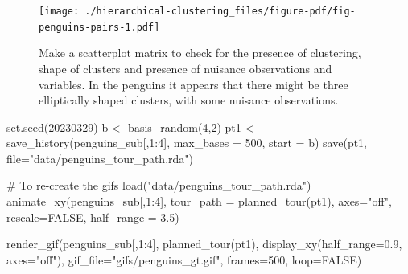 \documentclass[
  letterpaper,
]{book}
\newenvironment{Shaded}{\begin{snugshade}}{\end{snugshade}}
\newcommand{\AttributeTok}[1]{\textcolor[rgb]{0.40,0.45,0.13}{#1}}
\newcommand{\CommentTok}[1]{\textcolor[rgb]{0.37,0.37,0.37}{#1}}
\newcommand{\ConstantTok}[1]{\textcolor[rgb]{0.56,0.35,0.01}{#1}}
\newcommand{\DecValTok}[1]{\textcolor[rgb]{0.68,0.00,0.00}{#1}}
\newcommand{\FloatTok}[1]{\textcolor[rgb]{0.68,0.00,0.00}{#1}}
\newcommand{\FunctionTok}[1]{\textcolor[rgb]{0.28,0.35,0.67}{#1}}
\newcommand{\NormalTok}[1]{\textcolor[rgb]{0.00,0.23,0.31}{#1}}
\newcommand{\OtherTok}[1]{\textcolor[rgb]{0.00,0.23,0.31}{#1}}
\newcommand{\SpecialCharTok}[1]{\textcolor[rgb]{0.37,0.37,0.37}{#1}}
\newcommand{\StringTok}[1]{\textcolor[rgb]{0.13,0.47,0.30}{#1}}
\begin{document}
\begin{figure}[H]

{\centering \texttt{[image: ./hierarchical-clustering\_files/figure-pdf/fig-penguins-pairs-1.pdf]}

}

\caption{\label{fig-penguins-pairs}Make a scatterplot matrix to check
for the presence of clustering, shape of clusters and presence of
nuisance observations and variables. In the penguins it appears that
there might be three elliptically shaped clusters, with some nuisance
observations.}

\end{figure}

\begin{Shaded}
\begin{Highlighting}[]
\FunctionTok{set.seed}\NormalTok{(}\DecValTok{20230329}\NormalTok{)}
\NormalTok{b }\OtherTok{\textless{}{-}} \FunctionTok{basis\_random}\NormalTok{(}\DecValTok{4}\NormalTok{,}\DecValTok{2}\NormalTok{)}
\NormalTok{pt1 }\OtherTok{\textless{}{-}} \FunctionTok{save\_history}\NormalTok{(penguins\_sub[,}\DecValTok{1}\SpecialCharTok{:}\DecValTok{4}\NormalTok{], }
                    \AttributeTok{max\_bases =} \DecValTok{500}\NormalTok{, }
                    \AttributeTok{start =}\NormalTok{ b)}
\FunctionTok{save}\NormalTok{(pt1, }\AttributeTok{file=}\StringTok{"data/penguins\_tour\_path.rda"}\NormalTok{)}

\CommentTok{\# To re{-}create the gifs}
\FunctionTok{load}\NormalTok{(}\StringTok{"data/penguins\_tour\_path.rda"}\NormalTok{)}
\FunctionTok{animate\_xy}\NormalTok{(penguins\_sub[,}\DecValTok{1}\SpecialCharTok{:}\DecValTok{4}\NormalTok{], }
           \AttributeTok{tour\_path =} \FunctionTok{planned\_tour}\NormalTok{(pt1), }
           \AttributeTok{axes=}\StringTok{"off"}\NormalTok{, }\AttributeTok{rescale=}\ConstantTok{FALSE}\NormalTok{, }
           \AttributeTok{half\_range =} \FloatTok{3.5}\NormalTok{)}

\FunctionTok{render\_gif}\NormalTok{(penguins\_sub[,}\DecValTok{1}\SpecialCharTok{:}\DecValTok{4}\NormalTok{], }
           \FunctionTok{planned\_tour}\NormalTok{(pt1), }
           \FunctionTok{display\_xy}\NormalTok{(}\AttributeTok{half\_range=}\FloatTok{0.9}\NormalTok{, }\AttributeTok{axes=}\StringTok{"off"}\NormalTok{),}
           \AttributeTok{gif\_file=}\StringTok{"gifs/penguins\_gt.gif"}\NormalTok{,}
           \AttributeTok{frames=}\DecValTok{500}\NormalTok{,}
           \AttributeTok{loop=}\ConstantTok{FALSE}\NormalTok{)}
\end{Highlighting}
\end{Shaded}
\end{document}
